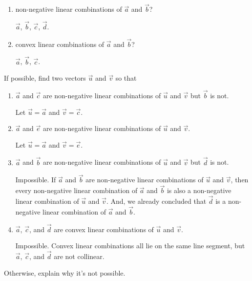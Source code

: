 \documentclass{workbook}
\begin{document}
\begin{slide}
\begin{parts}
\begin{enumerate}
				\item non-negative linear combinations of $\vec a$ and $\vec b$?
				\begin{solution}[inline]
					$\vec a$, $\vec b$, $\vec c$, $\vec d$.
				\end{solution}

				\item convex linear combinations of $\vec a$ and $\vec b$?
				\begin{solution}[inline]
					$\vec a$, $\vec b$, $\vec c$.
				\end{solution}
			\end{enumerate}

		\item If possible, find two vectors $\vec u$ and $\vec v$ so that
			\begin{enumerate}
				\item $\vec a$ and $\vec c$ are non-negative linear combinations
					of $\vec u$ and $\vec v$ but $\vec b$ is not.
				\begin{solution}
					Let $\vec u=\vec a$ and $\vec v=\vec c$.
				\end{solution}

				\item $\vec a$ and $\vec e$ are non-negative linear combinations
					of $\vec u$ and $\vec v$.
				\begin{solution}
					Let $\vec u=\vec a$ and $\vec v=\vec e$.
				\end{solution}

				\item $\vec a$ and $\vec b$ are non-negative linear combinations
					of $\vec u$ and $\vec v$ but $\vec d$ is not.
				\begin{solution}
					Impossible. If $\vec a$ and $\vec b$ are non-negative
					linear combinations of $\vec u$ and $\vec v$, then every non-negative
					linear combination of $\vec a$ and $\vec b$ is also a non-negative
					linear combination of $\vec u$ and $\vec v$. And, we already concluded that
					$\vec d$ is a non-negative linear combination of $\vec a$ and $\vec b$.
				\end{solution}

				\item $\vec a$, $\vec c$, and $\vec d$ are convex linear
					combinations of $\vec u$ and $\vec v$.
				\begin{solution}
					Impossible. Convex linear combinations all lie on the same line segment,
					but $\vec a$, $\vec c$, and $\vec d$ are not collinear.
				\end{solution}
			\end{enumerate}Otherwise, explain why it's not possible.
	\end{parts}
\end{slide}
\end{document}
